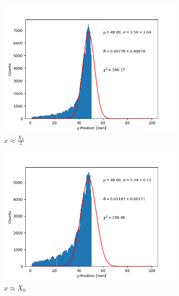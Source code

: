 \documentclass[sn-mathphys-num,iicol]{sn-jnl}
\theoremstyle{thmstyleone}
\theoremstyle{thmstyletwo}
\theoremstyle{thmstylethree}
\begin{document}
\begin{figure}[h]
    \centering
    \begin{subfigure}{0.49\textwidth}
        \includegraphics[width=\textwidth]{../src/elsa/finished_plots/Copper, Half Radiation Length, 40cm Distance.png}
        \caption{$x\approx\frac{X_0}{2}$}
    \end{subfigure}
    \begin{subfigure}{0.49\textwidth}
        \includegraphics[width=\textwidth]{../src/elsa/finished_plots/Copper, One Radiation Length, 40cm Distance.png}
        \caption{$x\approx X_0$}
    \end{subfigure}
    \begin{subfigure}{0.49\textwidth}

\end{subfigure}
\end{figure}
\end{document}
